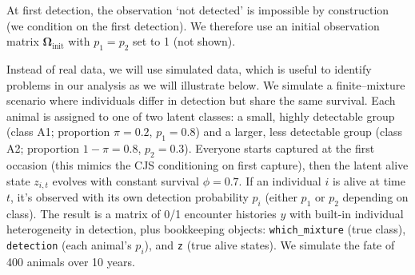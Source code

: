 \documentclass[
  12pt,
]{krantz}
\begin{document}
At first detection, the observation `not detected' is impossible by construction (we condition on the first detection). We therefore use an initial observation matrix \(\mathbf{\Omega}_{\text{init}}\) with \(p_1 = p_2\) set to 1 (not shown).

Instead of real data, we will use simulated data, which is useful to identify problems in our analysis as we will illustrate below. We simulate a finite--mixture scenario where individuals differ in detection but share the same survival. Each animal is assigned to one of two latent classes: a small, highly detectable group (class A1; proportion \(\pi = 0.2\), \(p_1=0.8\)) and a larger, less detectable group (class A2; proportion \(1-\pi = 0.8\), \(p_2=0.3\)). Everyone starts captured at the first occasion (this mimics the CJS conditioning on first capture), then the latent alive state \(z_{i,t}\) evolves with constant survival \(\phi = 0.7\). If an individual \(i\) is alive at time \(t\), it's observed with its own detection probability \(p_i\) (either \(p_1\) or \(p_2\) depending on class). The result is a matrix of 0/1 encounter histories \(y\) with built-in individual heterogeneity in detection, plus bookkeeping objects: \texttt{which\_mixture} (true class), \texttt{detection} (each animal's \(p_i\)), and \texttt{z} (true alive states). We simulate the fate of 400 animals over 10 years.
\end{document}
